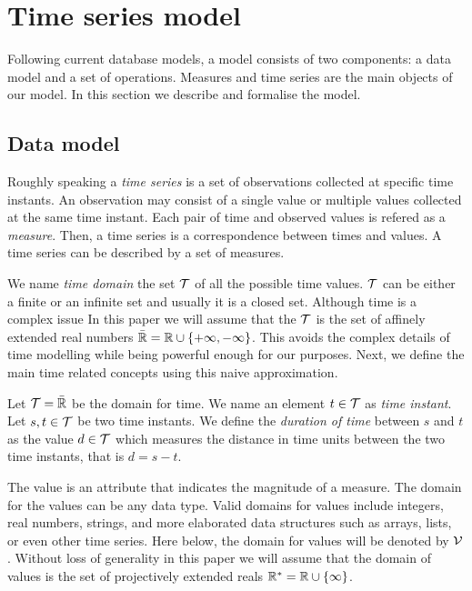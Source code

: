 
\section{Time series model}
\label{sec:model:TSMS}

Following current database models, a  model consists of two
components: a data model and a set of operations. Measures and time
series are the main objects of our  model. 
%
In this section we describe and formalise the  model. 


\subsection{Data model}

Roughly speaking a \emph{time series} is a set of observations
collected at specific time instants. An observation may consist of a
single value or multiple values collected at the same time instant.
Each pair of time and observed values is refered as a
\emph{measure}. Then, a time series is a correspondence between times
and values. A time series can be described by a set of measures.

We name \emph{time domain} the set $\cal{T}$ of all the possible time
values. $\cal{T}$ can be either a finite or an infinite set and
usually it is a closed set. Although time is a complex issue
%
%
In this paper we will assume that the $\cal{T}$ is the set of affinely
extended real numbers $\bar{\mathbb{R}} = \mathbb{R} \cup \{+\infty,-\infty\}$. This avoids
the complex details of time modelling while being powerful enough for
our purposes. Next, we define the main time related concepts using
this naive approximation.


\begin{definition}
  \label{def:model:temps}
  Let $\cal{T}=\bar{\mathbb{R}}$ be the domain for time.
  We name an element $t\in\cal{T}$ as \emph{time instant}.
  Let $s,t\in\cal{T}$ be two time instants.  We define the
  \emph{duration of time} between $s$ and $t$ as the value $d
  \in\cal{T}$ which measures the distance in time units between the
  two time instants, that is $d =s-t$.
\end{definition}

The value is an attribute that indicates the magnitude of a
measure. The domain for the values can be any data type. Valid domains
for values include integers, real numbers, strings, and more
elaborated data structures such as arrays, lists, or even other time
series. Here below, the domain for values will be denoted by
$\cal{V}$. 
%
Without loss of generality in this paper we will assume that the
domain of values is the set of projectively extended reals $\mathbb{R}^{*} = \mathbb{R}
\cup \{\infty\}$.

